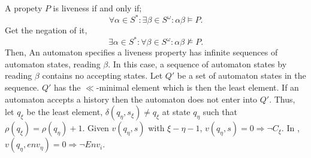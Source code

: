 \documentclass[12pt,a4paper,titlepage]{article}
\theoremstyle{break}
\begin{document}
A propety $P$ is liveness if and only if;
  \begin{displaymath}
\forall\alpha\in S^*\colon\exists\beta\in S^{\omega}\colon\alpha\beta\models P.
  \end{displaymath}
Get the negation of it,
  \begin{displaymath}
\exists\alpha\in S^*\colon\forall\beta\in S^{\omega}\colon\alpha\beta\not\models P.
  \end{displaymath}
Then, An automaton specifies a liveness property has infinite sequences of automaton states, reading \(\beta\).
In this case, a sequence of automaton states by reading \(\beta\) contains no accepting states.
Let \(Q'\) be a set of automaton states in the sequence.
\(Q'\) has the \(\ll\)-minimal element which is then the least element.
If an automaton accepts a history then the automaton does not enter into \(Q'\).
Thus, let \(q_{\xi}\) be the least element, \(\delta(q_{\eta},s_{\xi})\neq q_{\xi}\) at state \(q_{\eta}\) such that \(\rho(q_{\xi})=\rho(q_{\eta})+1\).
Given \(v(q_{\eta},s)\) with \(\xi-\eta-1\), \(v(q_{\eta},s)=0\Rightarrow\neg C_{\xi}\).
In \NHK, \(v(q_{\eta},env_{\eta})=0\Rightarrow\neg Env_i\).
\end{document}
